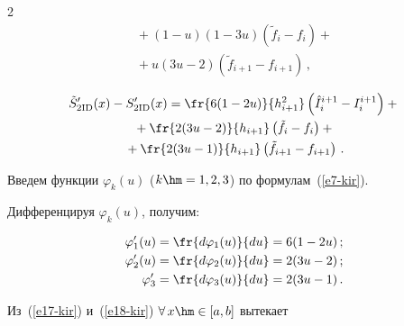 \begin{multicols}{2}
\begin{multline}
  {}+ (1-u)(1-3u) (\tilde{f}_i-f_i) +{}\\


  {}+u(3u-2) (\tilde{f}_{i+1}-f_{i+1})\,,


  \label{e17-kir}


  \end{multline}


  


  \vspace*{-12pt}


  


  \noindent


  \begin{multline}


  \tilde{S}^\prime_{2\mathrm{ID}}(x) -S^\prime_{2\mathrm{ID}}(x) = \fr{6(1-2u)}


  {h^2_{i+1}}\left( 


\hat{I}_i^{i+1}-I_i^{i+1}\right) +{}\\


  {}+ \fr{2(3u-2)}{h_{i+1}}\left(\tilde{f}_i-f_i\right) +{}\\


  {}+\fr{2(3u-1)}{h_{i+1}} \left( 


\tilde{f}_{i+1}-f_{i+1}\right)\,.


  \label{e18-kir}


  \end{multline}





Введем функции $\varphi_k(u)$ ($k\hm=1,2,3$) по формулам~(\ref{e7-kir}). 


Дифференцируя $\varphi_k(u)$, получим:


\begin{align*}


\varphi_1^\prime(u) &= \fr{d\varphi_1(u)}{du}=6(1-2u)\,;\\


\varphi^\prime_2(u) &= \fr{d\varphi_2(u)}{du}=2(3u-2)\,;\\


\varphi^\prime_3 &= \fr{d\varphi_3(u)}{du}=2(3u-1)\,.


\end{align*}





Из~(\ref{e17-kir}) и~(\ref{e18-kir}) $\forall\,x \hm\in [a,b]$ вытекает 



\end{multicols}
